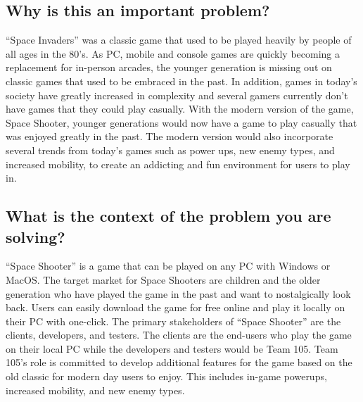 \documentclass{article}
\begin{document}
\subsection{Why is this an important problem?}

“Space Invaders” was a classic game that used to be played heavily by people of all ages in the 80’s. As PC, mobile and console games are quickly becoming a replacement for in-person arcades, the younger generation is missing out on classic games that used to be embraced in the past. In addition, games in today’s society have greatly increased in complexity and several gamers currently don’t have games that they could play casually. With the modern version of the game, Space Shooter, younger generations would now have a game to play casually that was enjoyed greatly in the past. The modern version would also incorporate several trends from today’s games such as power ups, new enemy types, and increased mobility, to create an addicting and fun environment for users to play in.

\subsection{What is the context of the problem you are solving?}

“Space Shooter” is a game that can be played on any PC with Windows or MacOS. The target market for Space Shooters are children and the older generation who have played the game in the past and want to nostalgically look back. Users can easily download the game for free online and play it locally on their PC with one-click.  The primary stakeholders of “Space Shooter” are the clients, developers, and testers. The clients are the end-users who play the game on their local PC while the developers and testers would be Team 105. Team 105’s role is committed to develop additional features for the game based on the old classic for modern day users to enjoy. This includes in-game powerups, increased mobility, and new enemy types. 
\end{document}
